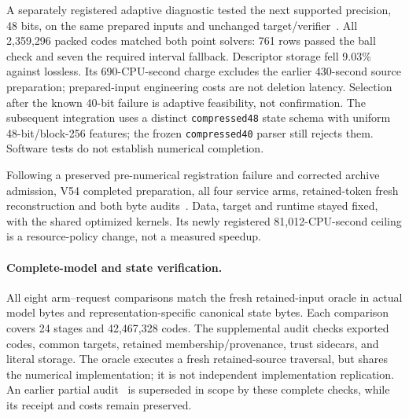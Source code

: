 \documentclass[10pt,twocolumn,letterpaper]{article}
\begin{document}
A separately registered adaptive diagnostic tested the next supported precision,
48 bits, on the same prepared inputs and unchanged target/verifier~\cite{v52}.
All 2,359,296 packed codes matched both point solvers: 761 rows passed the ball
check and seven the required interval fallback. Descriptor storage fell 9.03\%
against lossless. Its 690-CPU-second charge excludes the earlier 430-second source
preparation; prepared-input engineering costs are not deletion latency. Selection
after the known 40-bit failure is adaptive feasibility, not confirmation.
The subsequent integration uses a distinct \texttt{compressed48} state schema
with uniform 48-bit/block-256 features; the frozen \texttt{compressed40} parser
still rejects them. Software tests do not establish numerical completion.

Following a preserved pre-numerical registration failure and corrected archive
admission, V54 completed preparation, all four service arms, retained-token fresh
reconstruction and both byte audits~\cite{v54,v58terminal}. Data, target and
runtime stayed fixed, with the shared optimized kernels. Its newly registered
81,012-CPU-second ceiling is a resource-policy change, not a measured speedup.

\paragraph{Complete-model and state verification.}
All eight arm--request comparisons match the fresh retained-input oracle in
actual model bytes and representation-specific canonical state bytes. Each
comparison covers 24 stages and 42,467,328 codes. The supplemental audit checks
exported codes, common targets, retained membership/provenance, trust sidecars,
and literal storage. The oracle executes a fresh retained-source traversal,
but shares the numerical implementation; it is not independent implementation
replication. An earlier partial audit~\cite{v57prefix} is superseded in scope
by these complete checks, while its receipt and costs remain preserved.
\end{document}
